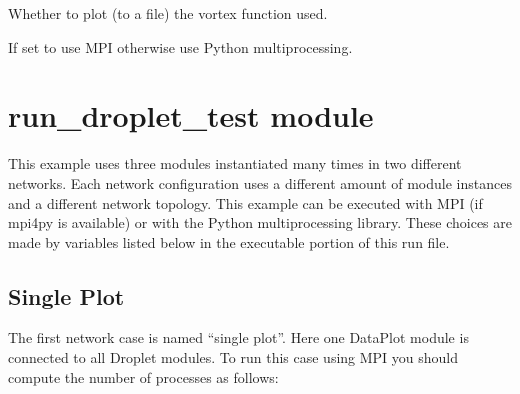 \documentclass[letterpaper,10pt,openany,oneside,english]{sphinxmanual}
\begin{document}
\begin{fulllineitems}
\begin{fulllineitems}
\end{fulllineitems}


\begin{fulllineitems}
\label{\detokenize{examples_rst/run_droplet_swirl:run_droplet_swirl.plot_vortex_profile}}
 \textendash{} Whether to plot (to a file) the vortex function used.

\end{fulllineitems}


\begin{fulllineitems}
\label{\detokenize{examples_rst/run_droplet_swirl:run_droplet_swirl.use_mpi}}
 \textendash{} If set to  use MPI otherwise use Python multiprocessing.

\end{fulllineitems}


\end{fulllineitems}



\section{run\_droplet\_test module}
\label{\detokenize{examples_rst/run_droplet_test:module-run_droplet_test}}\label{\detokenize{examples_rst/run_droplet_test:run-droplet-test-module}}\label{\detokenize{examples_rst/run_droplet_test::doc}}
This example uses three modules instantiated many times in two different networks.
Each network configuration uses a different amount of module instances and a different
network topology. This example can be executed with MPI (if mpi4py is available) or
with the Python multiprocessing library. These choices are made by variables listed
below in the executable portion of this run file.


\subsection{Single Plot}
\label{\detokenize{examples_rst/run_droplet_test:single-plot}}
The first network case is named “single plot”. Here one DataPlot module is connected
to all Droplet modules. To run this case using MPI you should compute the number of
processes as follows:
\begin{quote}

\end{quote}
\end{document}
